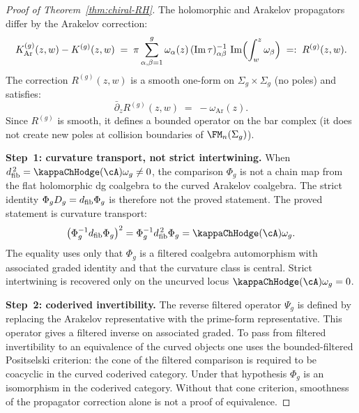 \begin{proof}[Proof of Theorem~\textup{\ref{thm:chiral-RH}}]
The holomorphic and Arakelov propagators differ by the Arakelov
correction:
\begin{equation}\label{eq:propagator-difference}
 K^{(g)}_{\mathrm{Ar}}(z,w) - K^{(g)}(z,w)
 \;=\;
 \pi \sum_{\alpha,\beta=1}^g
 \omega_\alpha(z)\,
 (\operatorname{Im}\tau)^{-1}_{\alpha\beta}\,
 \operatorname{Im}\Bigl(\int_w^z \omega_\beta\Bigr)
 \;=:\;
 R^{(g)}(z,w).
\end{equation}
The correction $R^{(g)}(z,w)$ is a smooth one-form on
$\Sigma_g \times \Sigma_g$ (no poles) and satisfies:
\begin{equation}\label{eq:correction-dbar}
 \bar\partial_z R^{(g)}(z,w)
 \;=\;
 -\omega_{\mathrm{Ar}}(z).
\end{equation}
Since $R^{(g)}$ is smooth, it defines a bounded operator on the bar
complex (it does not create new poles at collision boundaries of
$\FM_n(\Sigma_g)$).

\smallskip\noindent
\textbf{Step~1: curvature transport, not strict intertwining.}
When $\dfib^{\,2}=\kappaChHodge(\cA)\omega_g\ne0$, the comparison
$\Phi_g$ is not a chain map from the flat holomorphic dg coalgebra
to the curved Arakelov coalgebra. The strict identity
$\Phi_gD_{g}=d_{\mathrm{fib}}\Phi_g$ is therefore not the proved statement.
The proved statement is curvature transport:
\[
 \bigl(\Phi_g^{-1}\dfib\Phi_g\bigr)^2
 =
 \Phi_g^{-1}\dfib^{\,2}\Phi_g
 =
 \kappaChHodge(\cA)\omega_g .
\]
The equality uses only that $\Phi_g$ is a filtered coalgebra
automorphism with associated graded identity and that the curvature
class is central. Strict intertwining is recovered only on the
uncurved locus $\kappaChHodge(\cA)\omega_g=0$.

\smallskip\noindent
\textbf{Step~2: coderived invertibility.}
The reverse filtered operator $\Psi_g$ is defined by replacing the
Arakelov representative with the prime-form representative. This
operator gives a filtered inverse on associated graded. To pass from
filtered invertibility to an equivalence of the curved objects one
uses the bounded-filtered Positselski criterion: the cone of the
filtered comparison is required to be coacyclic in the curved
coderived category. Under that hypothesis $\Phi_g$ is an isomorphism
in the coderived category. Without that cone criterion, smoothness of
the propagator correction alone is not a proof of equivalence.


\end{proof}
